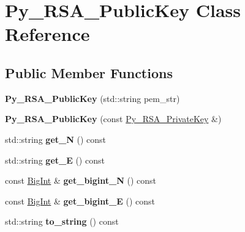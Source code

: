 \hypertarget{classPy__RSA__PublicKey}{\section{Py\-\_\-\-R\-S\-A\-\_\-\-Public\-Key Class Reference}
\label{classPy__RSA__PublicKey}
}
\subsection*{Public Member Functions}
\begin{DoxyCompactItemize}
\item 
\hypertarget{classPy__RSA__PublicKey_a0152eff1ab5f8f1161ebb27f47f2e78e}{{\bfseries Py\-\_\-\-R\-S\-A\-\_\-\-Public\-Key} (std\-::string pem\-\_\-str)}\label{classPy__RSA__PublicKey_a0152eff1ab5f8f1161ebb27f47f2e78e}

\item 
\hypertarget{classPy__RSA__PublicKey_ae0984ee7e2c1cf6b46713264b7859a73}{{\bfseries Py\-\_\-\-R\-S\-A\-\_\-\-Public\-Key} (const \hyperlink{classPy__RSA__PrivateKey}{Py\-\_\-\-R\-S\-A\-\_\-\-Private\-Key} \&)}\label{classPy__RSA__PublicKey_ae0984ee7e2c1cf6b46713264b7859a73}

\item 
\hypertarget{classPy__RSA__PublicKey_aa3ecd69fe2d36e4a45375bb975fb4f47}{std\-::string {\bfseries get\-\_\-\-N} () const }\label{classPy__RSA__PublicKey_aa3ecd69fe2d36e4a45375bb975fb4f47}

\item 
\hypertarget{classPy__RSA__PublicKey_ab5edb0aaaaa46b35f2d06665584f3103}{std\-::string {\bfseries get\-\_\-\-E} () const }\label{classPy__RSA__PublicKey_ab5edb0aaaaa46b35f2d06665584f3103}

\item 
\hypertarget{classPy__RSA__PublicKey_a4d122a189c79f85387e6d2d89abd2673}{const \hyperlink{classBotan_1_1BigInt}{Big\-Int} \& {\bfseries get\-\_\-bigint\-\_\-\-N} () const }\label{classPy__RSA__PublicKey_a4d122a189c79f85387e6d2d89abd2673}

\item 
\hypertarget{classPy__RSA__PublicKey_a0c01a6514cb061d79efccb148c6f8401}{const \hyperlink{classBotan_1_1BigInt}{Big\-Int} \& {\bfseries get\-\_\-bigint\-\_\-\-E} () const }\label{classPy__RSA__PublicKey_a0c01a6514cb061d79efccb148c6f8401}

\item 
\hypertarget{classPy__RSA__PublicKey_adc2dc39b9f557000a5848a7edb7c8bbb}{std\-::string {\bfseries to\-\_\-string} () const }\label{classPy__RSA__PublicKey_adc2dc39b9f557000a5848a7edb7c8bbb}


\end{DoxyCompactItemize}
